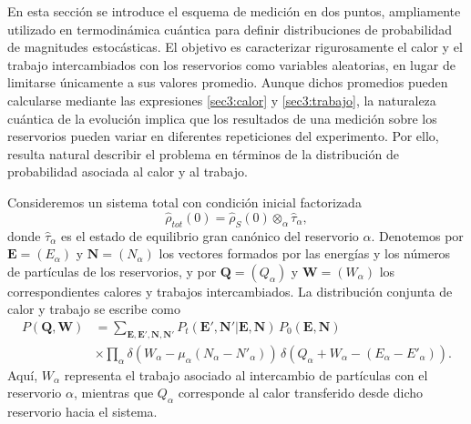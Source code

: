 En esta sección se introduce el esquema de medición en dos puntos, ampliamente utilizado en termodinámica cuántica para definir distribuciones de probabilidad de magnitudes estocásticas\cite{esposito2009nonequilibrium}. El objetivo es caracterizar rigurosamente el calor y el trabajo intercambiados con los reservorios como variables aleatorias, en lugar de limitarse únicamente a sus valores promedio. Aunque dichos promedios pueden calcularse mediante las expresiones \eqref{sec3:calor} y \eqref{sec3:trabajo}, la naturaleza cuántica de la evolución implica que los resultados de una medición sobre los reservorios pueden variar en diferentes repeticiones del experimento. Por ello, resulta natural describir el problema en términos de la distribución de probabilidad asociada al calor y al trabajo.

Consideremos un sistema total con condición inicial factorizada
\[
\hat{\rho}_{tot}(0) = \hat{\rho}_{S}(0)\otimes_{\alpha}\hat{\tau}_{\alpha},
\]
donde $\hat{\tau}_{\alpha}$ es el estado de equilibrio gran canónico del reservorio $\alpha$. Denotemos por $\mathbf{E}=(E_{\alpha})$ y $\mathbf{N}=(N_{\alpha})$ los vectores formados por las energías y los números de partículas de los reservorios, y por $\mathbf{Q}=(Q_{\alpha})$ y $\mathbf{W}=(W_{\alpha})$ los correspondientes calores y trabajos intercambiados. La distribución conjunta de calor y trabajo se escribe como
\begin{align*}
    P(\mathbf{Q},\mathbf{W}) & = \sum_{\mathbf{E},\mathbf{E}',\mathbf{N},\mathbf{N}'} 
    P_{t}(\mathbf{E}',\mathbf{N}'|\mathbf{E},\mathbf{N})\, P_{0}(\mathbf{E},\mathbf{N}) \\
    & \times \prod_{\alpha} \delta\!\left(W_{\alpha}-\mu_{\alpha}(N_{\alpha}-N'_{\alpha})\right)\,
    \delta\!\left(Q_{\alpha}+W_{\alpha}-(E_{\alpha}-E'_{\alpha})\right).
\end{align*}
Aquí, $W_\alpha$ representa el trabajo asociado al intercambio de partículas con el reservorio $\alpha$, mientras que $Q_\alpha$ corresponde al calor transferido desde dicho reservorio hacia el sistema.
\\

